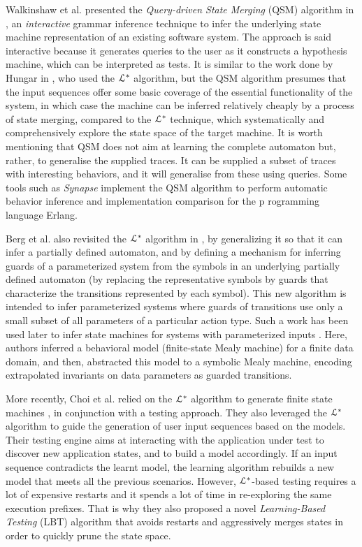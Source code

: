 Walkinshaw et al. presented the \textit{Query-driven State
Merging} (QSM) algorithm in
\cite{Walkinshaw07reverseengineering}, an \textit{interactive}
grammar inference technique to infer the underlying state machine
representation of an existing software system. The approach is
said interactive because it generates queries to the user as it
constructs a hypothesis machine, which can be interpreted as
tests. It is similar to the work done by Hungar in \cite{hungar},
who used the $\EuScript{L}^*$ algorithm, but the QSM
algorithm presumes that the input sequences offer some basic
coverage of the essential functionality of the system, in which
case the machine can be inferred relatively cheaply by a process
of state merging, compared to the $\EuScript{L}^*$ technique,
which systematically and comprehensively explore the state space
of the target machine. It is worth mentioning that QSM does not
aim at learning the complete automaton but, rather, to generalise
the supplied traces. It can be supplied a subset of traces with
interesting behaviors, and it will generalise from these using
queries. Some tools such as \textit{Synapse}
\cite{LamelaSeijas:2014:SAB:2633448.2633457} implement the QSM
algorithm to perform automatic behavior inference and
implementation comparison for the p rogramming language Erlang.

Berg et al. also revisited the $\EuScript{L}^*$ algorithm in
\cite{regularinfBerg06}, by generalizing it so that it can infer
a partially defined automaton, and by defining a mechanism for
inferring guards of a parameterized system from the symbols in an
underlying partially defined automaton (by replacing the
representative symbols by guards that characterize the
transitions represented by each symbol). This new algorithm is
intended to infer parameterized systems where guards of
transitions use only a small subset of all parameters of a
particular action type. Such a work has been used later to infer
state machines for systems with parameterized inputs
\cite{regularinfBerg08}. Here, authors inferred a behavioral
model (finite-state Mealy machine) for a finite data domain, and
then, abstracted this model to a symbolic Mealy machine, encoding
extrapolated invariants on data parameters as guarded
transitions.

More recently, Choi et al. relied on the $\EuScript{L}^*$
algorithm to generate finite state machines \cite{Choi2013}, in
conjunction with a testing approach. They also leveraged the
$\EuScript{L}^*$ algorithm to guide the generation of user input
sequences based on the models. Their testing engine aims at
interacting with the application under test to discover new
application states, and to build a model accordingly. If an input
sequence contradicts the learnt model, the learning algorithm
rebuilds a new model that meets all the previous scenarios.
However, $\EuScript{L}^*$-based testing requires a lot of
expensive restarts and it spends a lot of time in re-exploring
the same execution prefixes. That is why they also proposed a
novel \textit{Learning-Based Testing} (LBT) algorithm that avoids
restarts and aggressively merges states in order to quickly prune
the state space.

